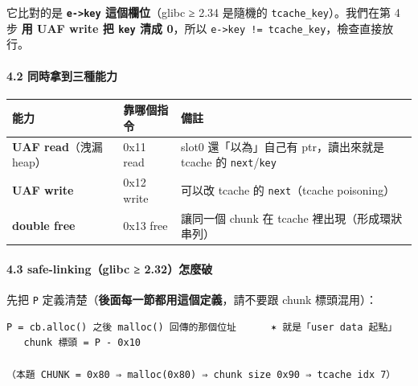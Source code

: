 \documentclass[10pt,a4paper]{article}
\newcounter{none}
\begin{document}
它比對的是 \textbf{\texttt{e-\allowbreak{}\textgreater{}\allowbreak{}key} 這個欄位}（glibc ≥ 2.34
是隨機的 \texttt{tcache\_\allowbreak{}key}）。我們在第 4 步 \textbf{用 UAF write 把
\texttt{key} 清成 0}，所以
\texttt{e-\allowbreak{}\textgreater{}\allowbreak{}key\ \allowbreak{}!=\ \allowbreak{}tcache\_\allowbreak{}key}，檢查直接放行。

\paragraph{4.2
同時拿到三種能力}\label{ux540cux6642ux62ffux5230ux4e09ux7a2eux80fdux529b}

{\def\LTcaptype{none} %
\begin{longtable}[]{@{}
  >{\raggedright\arraybackslash}p{}
  >{\raggedright\arraybackslash}p{}
  >{\raggedright\arraybackslash}p{}@{}}
\toprule\noalign{}
\begin{minipage}[b]{\linewidth}\raggedright
能力
\end{minipage} & \begin{minipage}[b]{\linewidth}\raggedright
靠哪個指令
\end{minipage} & \begin{minipage}[b]{\linewidth}\raggedright
備註
\end{minipage} \\
\midrule\noalign{}
\endhead
\bottomrule\noalign{}
\endlastfoot
\textbf{UAF read}（洩漏 heap） & 0x11 read & slot0 還「以為」自己有
ptr，讀出來就是 tcache 的 \texttt{next}/\texttt{key} \\
\textbf{UAF write} & 0x12 write & 可以改 tcache 的 \texttt{next}（tcache
poisoning） \\
\textbf{double free} & 0x13 free & 讓同一個 chunk 在 tcache
裡出現（形成環狀串列） \\
\end{longtable}
}

\paragraph{4.3 safe-linking（glibc ≥
2.32）怎麼破}\label{safe-linkingglibc-2.32ux600eux9ebcux7834}

先把 \texttt{P} 定義清楚（\textbf{後面每一節都用這個定義}，請不要跟
chunk 標頭混用）：

\begin{Verbatim}[breaklines=true,breakanywhere=true,breakautoindent=false,fontsize=\fontsize{7.0}{9.5}\selectfont]
   P = cb.alloc() 之後 malloc() 回傳的那個位址      ✶ 就是「user data 起點」
   chunk 標頭 = P - 0x10
   （本題 CHUNK = 0x80 ⇒ malloc(0x80) ⇒ chunk size 0x90 ⇒ tcache idx 7）
\end{Verbatim}
\end{document}
